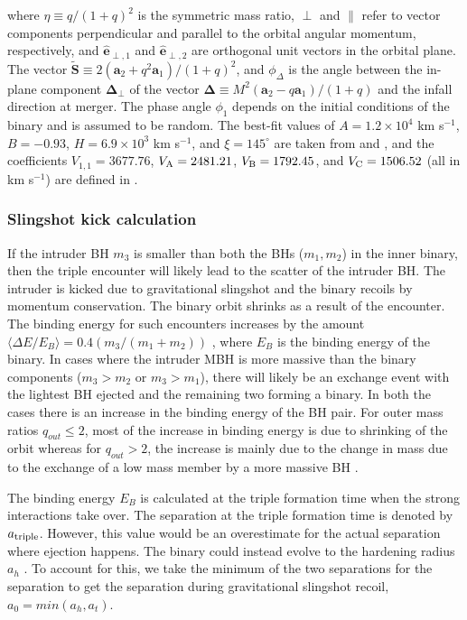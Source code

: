 \documentclass[11pt, letterpaper]{article}
\newcommand{\kms}{km s$^{-1}$}
\begin{document}
where $\eta \equiv q/(1+q)^2$ is the symmetric mass ratio, $\perp$ and $\parallel$ refer to vector components perpendicular and parallel to the orbital angular momentum, respectively, and ${\mathbf {\hat e}_{\perp,1}}$ and ${\mathbf {\hat e}_{\perp,2}}$ are orthogonal unit vectors in the orbital plane. The vector ${\mathbf {\tilde S}} \equiv 2({\mathbf a_2} + q^2 {\mathbf a_1})/(1+q)^2$, and $\phi_{\Delta}$ is the angle between the in-plane component ${\mathbf \Delta_{\perp}}$ of the vector ${\mathbf \Delta} \equiv M^2({\mathbf a_2} - q {\mathbf a_1})/(1+q)$ and the infall direction at merger. The phase angle $\phi_1$ depends on the initial conditions of the binary and is assumed to be random. The best-fit values of $A = 1.2\times 10^4$ \kms, $B = -0.93$, $H = 6.9\times10^3$ \kms, and $\xi = 145^{\circ}$ are taken from \cite{Gonz_lez_2007} and \cite{Lousto2008}, and the coefficients $V_{1,1} = 3677.76$, $V_{\rm A} = 2481.21$, $V_{\rm B} = 1792.45$, and $V_{\rm C} = 1506.52$ (all in km s$^{-1}$) are defined in \cite{Lousto_2012}.


\subsubsection{Slingshot kick calculation}
\label{sec: slingshot-kick}

If the intruder BH $m_3$ is smaller than both the BHs ($m_1,m_2$) in the inner binary, then the triple encounter will likely lead to the scatter of the intruder BH. The intruder is kicked due to gravitational slingshot and the binary recoils by momentum conservation. The binary orbit shrinks as a result of the encounter. The binding energy for such encounters increases by the amount $\langle\Delta E/ E_B\rangle = 0.4 (m_3/(m_1 + m_2))$ \citep{Hills1980}, where $E_B$ is the binding energy of the binary. In cases where the intruder MBH is more massive than the binary components ($m_3 > m_2$ or $m_3 > m_1$), there will likely be an exchange event with the lightest BH ejected and the remaining two forming a binary. In both the cases there is an increase in the binding energy of the BH pair. For outer mass ratios $q_{out} \leq 2$, most of the increase in binding energy is due to shrinking of the orbit whereas for $q_{out} > 2$, the increase is mainly due to the change in mass due to the exchange of a low mass member by a more massive BH \citep{volonteri_assembly_2003}. 

The binding energy $E_B$ is calculated at the triple formation time when the strong interactions take over. The separation at the triple formation time is denoted by 
$a_{\rm triple}$. However, this value would be an overestimate for the actual separation where ejection happens. The binary could instead evolve to the hardening radius $a_h$ \citep{quinlan_dynamical_1997,Begelman1980}. To account for this, we take the minimum of the two separations for the separation to get the separation during gravitational slingshot recoil, $a_{0} = min(a_h, a_{t})$.
\end{document}
